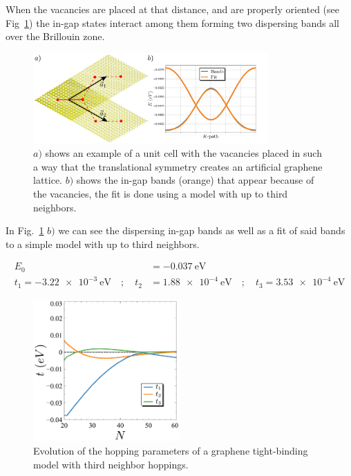 When the vacancies are placed at that distance, and are properly oriented (see Fig~\ref{graphene}) the in-gap states interact among them forming two dispersing bands all over the Brillouin zone.
\begin{figure}[h!]
  \centering
  \includegraphics[width=0.8\textwidth]{artlat/fig/graphene_bands.pdf}
  \vspace{-5pt}
  \caption{$a)$ shows an example of a unit cell with the vacancies placed in such a way that the translational symmetry creates an artificial graphene lattice. $b)$ shows the in-gap bands (orange) that appear because of the vacancies, the fit is done using a model with up to third neighbors.}
  \label{graphene}
\end{figure}
\FloatBarrier
In Fig.~\ref{graphene} $b)$ we can see the dispersing in-gap bands as well as a fit of said bands to a simple model with up to third neighbors.

\begin{equation}
\begin{split}
  E_0 &= \SI{-0.037}{\eV}\\
  t_1 = \SI{-3.22e-3}{\eV} \quad;\quad
  t_2 &= \SI{1.88e-4}{\eV} \quad;\quad
  t_3 = \SI{3.53e-4}{\eV}
\end{split}
\end{equation}

\begin{figure}[!ht!]
\centering
\includegraphics[width=0.5\textwidth]{artlat/fig/params.pdf}
\vspace{-5pt}
\caption{Evolution of the hopping parameters of a graphene tight-binding model with third neighbor hoppings.}
\label{hopp}
\end{figure}
\FloatBarrier






